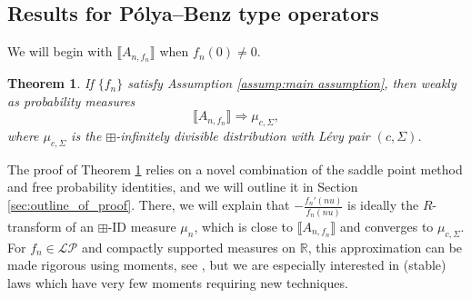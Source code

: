 \documentclass[reqno]{amsart}
\newcommand{\1}{\mathbf{1}}
\newcommand{\R}{\mathbb{R}}
\def\R{\mathbb{R}}
\newcommand{\LP}{\mathcal{LP}}
\theoremstyle{plain}
\newtheorem{theorem}{Theorem}[section]
\theoremstyle{definition}
\theoremstyle{remark}
\newtheorem{remark}[theorem]{Remark}
\numberwithin{equation}{section}
\begin{document}
\subsection{Results for P\'olya--Benz type operators} We will begin with $\llbracket A_{n,f_n}\rrbracket$ when $f_{n}(0)\neq 0$. 
\begin{theorem}\label{thm:main result, general}
If $\{f_{n}\}$ satisfy Assumption \ref{assump:main assumption}, then weakly as probability measures  \begin{equation}
	\llbracket A_{n,f_n}\rrbracket\Rightarrow \mu_{c,\Sigma},
\end{equation} 
where $\mu_{c,\Sigma}$ is the $\boxplus$-infinitely divisible distribution with L\'evy pair $(c,\Sigma)$. 
\end{theorem}
%

The proof of Theorem \ref{thm:main result, general} relies on a novel combination of the saddle point method and free probability identities,  and we will outline it in Section \ref{sec:outline_of_proof}.
There, we will explain that $-\frac{f_n'(nu)}{f_n(nu)}$ is ideally the $R$-transform of an $\boxplus$-ID measure $\mu_{n}$, which is close to $\llbracket A_{n,f_n}\rrbracket$ and converges to $\mu_{c,\Sigma}$. For $f_n\in\LP$ and compactly supported measures on $\R$, this approximation can be made rigorous using moments,  see \cite{campbell2025freeinfinitedivisibilityfractional,Arizmendi-Fujie2026}, but we are especially interested in (stable) laws which have very few moments requiring new techniques.
\end{document}
